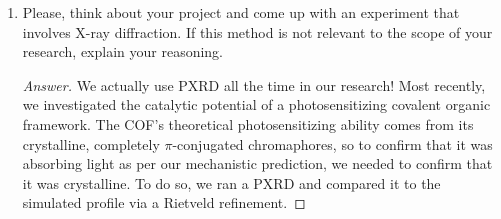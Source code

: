 \documentclass[../psets.tex]{subfiles}
\begin{document}
\begin{enumerate}
\begin{proof}[Answer]
        The strain $\varepsilon$ will depend on $\theta$ via the following relationship.
        \begin{align*}
            n\lambda &= 2(d-\varepsilon d)\sin(1.015\theta)\\
            2d\sin(\theta) &= 2d\sin(1.015\theta)-\varepsilon\cdot 2d\sin(1.015\theta)\\
            \Aboxed{\varepsilon &= \frac{\sin(1.015\theta)-\sin(\theta)}{\sin(1.015\theta)}}
        \end{align*}
        Plugging in $2\theta=39.036$ from Q9, for example, we get
        \begin{equation*}
            \boxed{\varepsilon = 0.014}
        \end{equation*}
    \end{proof}
    \item Please, think about your project and come up with an experiment that involves X-ray diffraction. If this method is not relevant to the scope of your research, explain your reasoning.
    \begin{proof}[Answer]
        We actually use PXRD all the time in our research! Most recently, we investigated the catalytic potential of a photosensitizing covalent organic framework\supercite{bib:COFProject}. The COF's theoretical photosensitizing ability comes from its crystalline, completely $\pi$-conjugated chromaphores, so to confirm that it was absorbing light as per our mechanistic prediction, we needed to confirm that it was crystalline. To do so, we ran a PXRD and compared it to the simulated profile via a Rietveld refinement.
    \end{proof}
\end{enumerate}
\end{document}
